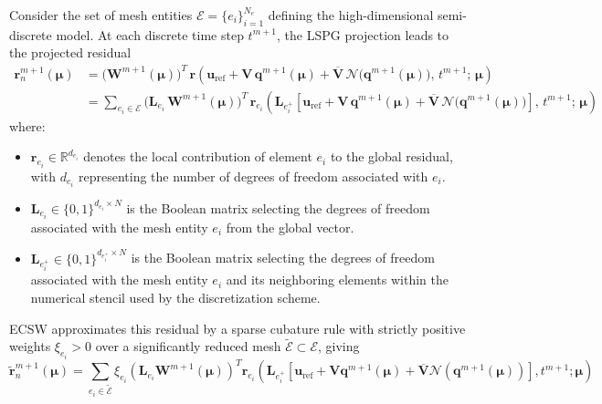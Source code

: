 \documentclass[preprint,10pt]{elsarticle}
\begin{document}
Consider the set of mesh entities $\mathcal{E}=\{e_i\}_{i=1}^{N_e}$ defining the high-dimensional semi-discrete model. 
At each discrete time step $t^{m+1}$, the LSPG projection leads to the projected residual
\begin{equation}
\begin{aligned}
\mathbf r_n^{m+1}(\boldsymbol\mu)
&=
\bigl(\mathbf W^{m+1}(\boldsymbol\mu)\bigr)^{T}
\,\mathbf r\!\left(
\mathbf u_{\mathrm{ref}} + \mathbf V\,\mathbf q^{m+1}(\boldsymbol\mu) 
+ \overline{\mathbf V}\,\mathcal N\!\bigl(\mathbf q^{m+1}(\boldsymbol\mu)\bigr),
\,t^{m+1};\,\boldsymbol\mu
\right)
\\
&=
\sum_{e_i\in\mathcal E}
\bigl(\mathbf L_{e_i}\,\mathbf W^{m+1}(\boldsymbol\mu)\bigr)^{T}
\,
\mathbf r_{e_i}\!\left(
\mathbf L_{e_i^+}\!\left[
\mathbf u_{\mathrm{ref}} + \mathbf V\,\mathbf q^{m+1}(\boldsymbol\mu) 
+ \overline{\mathbf V}\,\mathcal N\!\bigl(\mathbf q^{m+1}(\boldsymbol\mu)\bigr)
\right],\,t^{m+1};\,\boldsymbol\mu
\right)
\end{aligned}
\label{eq:lspg_elementwise_residual}
\end{equation}
where:
\begin{itemize}
    \item $\mathbf{r}_{e_i}\in \mathbb{R}^{d_{e_i}}$ denotes the local contribution of element $e_i$ to the global residual, with $d_{e_i}$ representing the number of degrees of freedom associated with $e_i$.
    \item $\mathbf{L}_{e_i}\in\{0,1\}^{d_{e_i}\times N}$ is the Boolean matrix selecting the degrees of freedom associated with the mesh entity $e_i$ from the global vector.
    \item $\mathbf{L}_{e_i^+}\in\{0,1\}^{d_{e_i^+}\times N}$ is the Boolean matrix selecting the degrees of freedom associated with the mesh entity $e_i$ and its neighboring elements within the numerical stencil used by the discretization scheme.
\end{itemize}
ECSW approximates this residual by a sparse cubature rule with strictly positive weights $\xi_{e_i} > 0$ over a significantly reduced mesh $\widetilde{\mathcal{E}} \subset \mathcal{E}$, giving
\begin{equation}
\widetilde{\mathbf{r}}_n^{m+1}(\boldsymbol\mu) =
\sum_{e_i \in \widetilde{\mathcal{E}}} \xi_{e_i}
\left(\mathbf{L}_{e_i}\mathbf{W}^{m+1}(\boldsymbol\mu)\right)^{T}
\mathbf{r}_{e_i}\left(\mathbf{L}_{e_i^+}\left[\mathbf{u}_{\mathrm{ref}} + \mathbf{V} \mathbf{q}^{m+1}(\boldsymbol\mu) + \overline{\mathbf{V}}\mathcal{N}(\mathbf{q}^{m+1}(\boldsymbol\mu))\right], t^{m+1}; \boldsymbol\mu\right)
\label{eq:lspg_residual_ann_hyper}
\end{equation}
\end{document}
